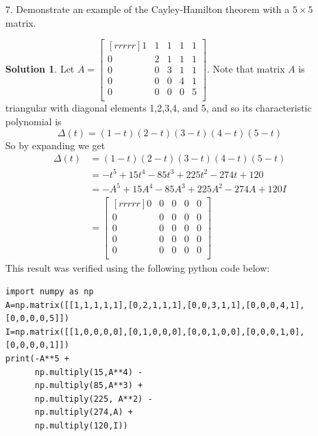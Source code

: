 \documentclass[12pt]{article}
\theoremstyle{definition}
\newtheorem*{solution}{Solution} %
\theoremstyle{plain}
\begin{document}
\begin{enumerate}
\item[7.] Demonstrate an example of the Cayley-Hamilton theorem with a $5 \times 5$ matrix.
\begin{solution}
Let $A=\begin{bmatrix}[rrrrr]1&1&1&1&1\\0&2&1&1&1\\0&0&3&1&1\\0&0&0&4&1\\0&0&0&0&5\\\end{bmatrix}$.
Note that matrix $A$ is triangular with diagonal elements 1,2,3,4, and 5, and so its characteristic polynomial is
\[ \Delta(t)=(1-t)(2-t)(3-t)(4-t)(5-t) \]
So by expanding we get
\begin{align*}
\Delta(t)&=(1-t)(2-t)(3-t)(4-t)(5-t)\\
&= -t^5 + 15 t^4 - 85 t^3 + 225 t^2 - 274 t + 120\\
&= -A^5+15A^4-85A^3+225A^2-274A+120I\\
&= \begin{bmatrix}[rrrrr]0&0&0&0&0\\0&0&0&0&0\\0&0&0&0&0\\0&0&0&0&0\\0&0&0&0&0\\\end{bmatrix}
\end{align*}
This result was verified using the following python code below:
\begin{verbatim}
import numpy as np
A=np.matrix([[1,1,1,1,1],[0,2,1,1,1],[0,0,3,1,1],[0,0,0,4,1],[0,0,0,0,5]])
I=np.matrix([[1,0,0,0,0],[0,1,0,0,0],[0,0,1,0,0],[0,0,0,1,0],[0,0,0,0,1]])
print(-A**5 + 
      np.multiply(15,A**4) -
      np.multiply(85,A**3) + 
      np.multiply(225, A**2) -
      np.multiply(274,A) +
      np.multiply(120,I))
\end{verbatim}
\end{solution}


\end{enumerate}
\end{document}
